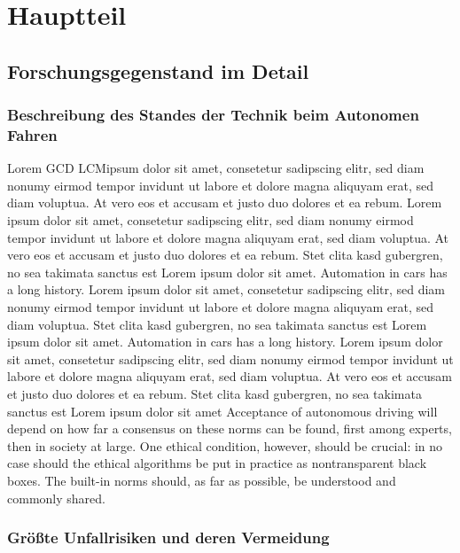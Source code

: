 \newpage
\chapter{Hauptteil}

\section{Forschungsgegenstand im Detail}
\subsection{Beschreibung des Standes der Technik beim Autonomen Fahren}

Lorem \ac{GCD} \ac{LCM}ipsum dolor sit amet, consetetur sadipscing elitr, sed diam nonumy eirmod tempor invidunt ut labore et dolore magna aliquyam erat, sed diam voluptua.
At vero eos et accusam et justo duo dolores et ea rebum.
Lorem ipsum dolor sit amet, consetetur sadipscing elitr, sed diam nonumy eirmod tempor invidunt ut labore et dolore magna aliquyam erat, sed diam voluptua.
At vero eos et accusam et justo duo dolores et ea rebum.
Stet clita kasd gubergren, no sea takimata sanctus est Lorem ipsum dolor sit amet.
Automation in cars has a long history.  Lorem ipsum dolor sit amet, consetetur sadipscing elitr, sed diam nonumy eirmod tempor invidunt ut labore et dolore magna aliquyam erat, sed diam voluptua.
Stet clita kasd gubergren, no sea takimata sanctus est Lorem ipsum dolor sit amet.
Automation in cars has a long history.  Lorem ipsum dolor sit amet, consetetur sadipscing elitr, sed diam nonumy eirmod tempor invidunt ut labore et dolore magna aliquyam erat, sed diam voluptua.
At vero eos et accusam et justo duo dolores et ea rebum.
Stet clita kasd gubergren, no sea takimata sanctus est Lorem ipsum dolor sit amet Acceptance of autonomous driving will depend on how far a consensus on these norms can be found, first among experts, then in society at large.
One ethical condition, however, should be crucial: in no case should the ethical algorithms be put in practice as nontransparent black boxes.
The built-in norms should, as far as possible, be understood and commonly shared.

\subsection{Größte Unfallrisiken und deren Vermeidung}


